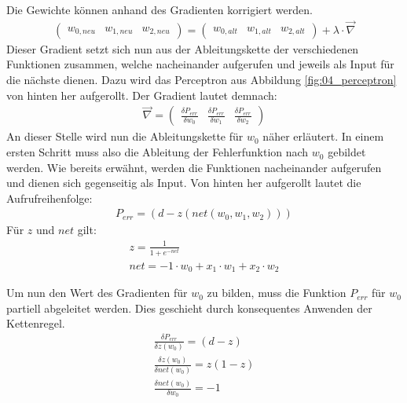 Die Gewichte können anhand des Gradienten korrigiert werden.
\begin{align}
    \begin{pmatrix}w_{0, neu} & w_{1, neu} & w_{2, neu}\end{pmatrix} = \begin{pmatrix}w_{0, alt} & w_{1, alt} & w_{2, alt}\end{pmatrix} + \lambda \cdot \vec{\nabla}
\end{align}
Dieser Gradient setzt sich nun aus der Ableitungskette der verschiedenen Funktionen zusammen, welche nacheinander aufgerufen
und jeweils als Input für die nächste dienen. Dazu wird das Perceptron aus Abbildung \ref{fig:04_perceptron} von
hinten her aufgerollt. Der Gradient lautet demnach:
\begin{align}
    \vec{\nabla} = \begin{pmatrix}\frac{\delta P_{err}}{\delta w_0} & \frac{\delta P_{err}}{\delta w_1} & \frac{\delta P_{err}}{\delta w_2} \end{pmatrix}
\end{align}
An dieser Stelle wird nun die Ableitungskette für $w_0$ näher erläutert. In einem ersten Schritt muss also die
Ableitung der Fehlerfunktion nach $w_0$ gebildet werden. Wie bereits erwähnt, werden die Funktionen nacheinander
aufgerufen und dienen sich gegenseitig als Input. Von hinten her aufgerollt lautet die Aufrufreihenfolge:
\begin{align}
    P_{err} = (d - z(net(w_0, w_1, w_2)))
\end{align}
Für $z$ und $net$ gilt:
\begin{align}
    z = \frac{1}{1 + e^{-net}}\\
    net = -1 \cdot w_0 + x_1 \cdot w_1 + x_2 \cdot w_2
\end{align}

Um nun den Wert des Gradienten für $w_0$ zu bilden, muss die Funktion $P_{err}$ für $w_0$ partiell abgeleitet
werden. Dies geschieht durch konsequentes Anwenden der Kettenregel.
\begin{align}
    \frac{\delta P_{err}}{\delta z(w_0)} = (d - z)\\
    \frac{\delta z(w_0)}{\delta net(w_0)} = z (1 - z)\\
    \frac{\delta net(w_0)}{\delta w_0} = -1
\end{align}


